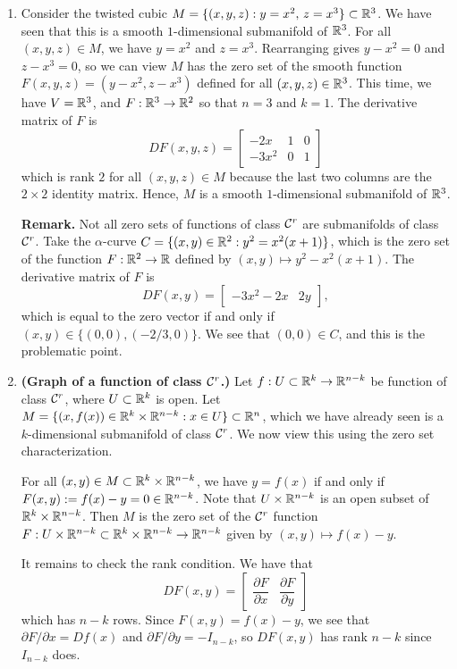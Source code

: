 \begin{enumerate}[(1)]
    \item Consider the twisted cubic $M = \{(x, y, z) : y = x^2,\, z = x^3\} \subset \mathbb{R}^3$.
    We have seen that this is a smooth $1$-dimensional submanifold of $\mathbb{R}^3$. 
    For all $(x, y, z) \in M$, we have $y = x^2$ and $z = x^3$. Rearranging 
    gives $y - x^2 = 0$ and $z - x^3 = 0$, so we can view $M$ has the zero 
    set of the smooth function $F(x, y, z) = (y-x^2, z-x^3)$ defined for all 
    $(x, y, z) \in \mathbb{R}^3$. This time, we have $V = \mathbb{R}^3$, and $F : 
    \mathbb{R}^3 \to \mathbb{R}^2$ so that $n = 3$ and $k = 1$. The derivative matrix of $F$ is 
    \[ DF(x, y, z) = \begin{bmatrix} 
        -2x & 1 & 0 \\ 
        -3x^2 & 0 & 1 
    \end{bmatrix} \] 
    which is rank $2$ for all $(x, y, z) \in M$ because the last two columns 
    are the $2 \times 2$ identity matrix. Hence, $M$ is a smooth $1$-dimensional 
    submanifold of $\mathbb{R}^3$.     

    {\bf Remark.} Not all zero sets of functions of class ${\cal C}^r$ are submanifolds 
    of class ${\cal C}^r$. Take the $\alpha$-curve $C = \{(x, y) \in \mathbb{R}^2 : y^2 = 
    x^2(x+1)\}$, which is the zero set of the function 
    $F : \mathbb{R}^2 \to \mathbb{R}$ defined by $(x, y) \mapsto y^2 - x^2(x+1)$. 
    The derivative matrix of $F$ is 
    \[ DF(x, y) = \begin{bmatrix} -3x^2 - 2x & 2y \end{bmatrix}, \] 
    which is equal to the zero vector if and only if $(x, y) \in 
    \{(0, 0), (-2/3, 0)\}$. We see that $(0, 0) \in C$, and this 
    is the problematic point. 

    \item {\bf (Graph of a function of class ${\cal C}^r$.)} Let $f : U \subset \mathbb{R}^k 
    \to \mathbb{R}^{n-k}$ be function of class ${\cal C}^r$, where $U \subset \mathbb{R}^k$ is open. 
    Let $M = \{(x, f(x)) \in \mathbb{R}^k \times \mathbb{R}^{n-k} : x \in U\} \subset \mathbb{R}^n$,
    which we have already seen is a $k$-dimensional submanifold of class ${\cal C}^r$. 
    We now view this using the zero set characterization. 

    For all $(x, y) \in M \subset \mathbb{R}^k \times \mathbb{R}^{n-k}$, we have 
    $y = f(x)$ if and only if $F(x, y) := f(x) - y = 0 \in \mathbb{R}^{n-k}$.
    Note that $U \times \mathbb{R}^{n-k}$ is an open subset of $\mathbb{R}^k \times \mathbb{R}^{n-k}$. 
    Then $M$ is the zero set of the ${\cal C}^r$ function $F : U \times \mathbb{R}^{n-k} 
    \subset \mathbb{R}^k \times \mathbb{R}^{n-k} \to \mathbb{R}^{n-k}$ given by $(x, y) \mapsto f(x) - y$.

    It remains to check the rank condition. We have that 
    \[ DF(x, y) = \left[ \begin{array}{c|c} 
        \dfrac{\partial F}{\partial x} & \dfrac{\partial F}{\partial y} 
    \end{array} \right] \]
    which has $n-k$ rows. Since $F(x, y) = f(x) - y$, we see that 
    $\partial F/\partial x = Df(x)$ and $\partial F/\partial y = -I_{n-k}$, 
    so $DF(x, y)$ has rank $n-k$ since $I_{n-k}$ does. 
\end{enumerate}

